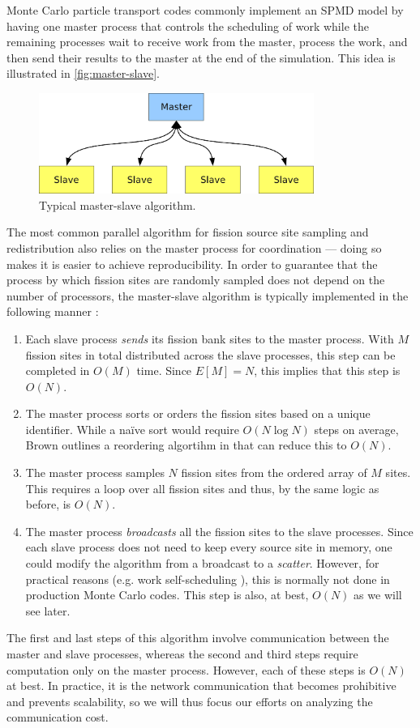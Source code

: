 Monte Carlo particle transport codes commonly implement an SPMD model by having
one master process that controls the scheduling of work while the remaining
processes wait to receive work from the master, process the work, and then send
their results to the master at the end of the simulation. This idea is
illustrated in \autoref{fig:master-slave}.
\begin{figure}[ht!]
  \centering
  \includegraphics[width=0.8\textwidth]{figures/ch3/master-slave/master-slave.pdf}
  \caption{Typical master-slave algorithm.}
  \label{fig:master-slave}
\end{figure}
The most common parallel algorithm for fission source site sampling and
redistribution also relies on the master process for coordination --- doing so
makes it is easier to achieve reproducibility. In order to guarantee that the
process by which fission sites are randomly sampled does not depend on the
number of processors, the master-slave algorithm is typically implemented in the
following manner \cite{lanl-x5-2008}:
\begin{enumerate}
\item Each slave process \emph{sends} its fission bank sites to the master
  process. With $M$ fission sites in total distributed across the slave
  processes, this step can be completed in $O(M)$ time. Since $E[M] = N$, this
  implies that this step is $O(N)$.
\item The master process sorts or orders the fission sites based on a unique
  identifier. While a naïve sort would require $O(N \log N)$ steps on average,
  Brown outlines a reordering algortihm in \cite{trans-brown-1992} that can
  reduce this to $O(N)$.
\item The master process samples $N$ fission sites from the ordered array of $M$
  sites. This requires a loop over all fission sites and thus, by the same logic
  as before, is $O(N)$.
\item The master process \emph{broadcasts} all the fission sites to the slave
  processes. Since each slave process does not need to keep every source site in
  memory, one could modify the algorithm from a broadcast to a
  \emph{scatter}. However, for practical reasons (e.g. work self-scheduling
  \cite{lanl-brown-2005}), this is normally not done in production Monte Carlo
  codes. This step is also, at best, $O(N)$ as we will see later.
\end{enumerate}
The first and last steps of this algorithm involve communication between the
master and slave processes, whereas the second and third steps require
computation only on the master process. However, each of these steps is $O(N)$
at best. In practice, it is the network communication that becomes prohibitive
and prevents scalability, so we will thus focus our efforts on analyzing the
communication cost.

